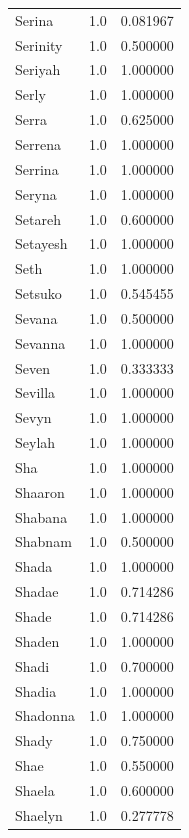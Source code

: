 \documentclass[
  letterpaper,
  DIV=11,
  numbers=noendperiod]{scrreprt}
\begin{document}
\begin{tabular}{lrr}
Serina          &   1.0 &   0.081967 \\
Serinity        &   1.0 &   0.500000 \\
Seriyah         &   1.0 &   1.000000 \\
Serly           &   1.0 &   1.000000 \\
Serra           &   1.0 &   0.625000 \\
Serrena         &   1.0 &   1.000000 \\
Serrina         &   1.0 &   1.000000 \\
Seryna          &   1.0 &   1.000000 \\
Setareh         &   1.0 &   0.600000 \\
Setayesh        &   1.0 &   1.000000 \\
Seth            &   1.0 &   1.000000 \\
Setsuko         &   1.0 &   0.545455 \\
Sevana          &   1.0 &   0.500000 \\
Sevanna         &   1.0 &   1.000000 \\
Seven           &   1.0 &   0.333333 \\
Sevilla         &   1.0 &   1.000000 \\
Sevyn           &   1.0 &   1.000000 \\
Seylah          &   1.0 &   1.000000 \\
Sha             &   1.0 &   1.000000 \\
Shaaron         &   1.0 &   1.000000 \\
Shabana         &   1.0 &   1.000000 \\
Shabnam         &   1.0 &   0.500000 \\
Shada           &   1.0 &   1.000000 \\
Shadae          &   1.0 &   0.714286 \\
Shade           &   1.0 &   0.714286 \\
Shaden          &   1.0 &   1.000000 \\
Shadi           &   1.0 &   0.700000 \\
Shadia          &   1.0 &   1.000000 \\
Shadonna        &   1.0 &   1.000000 \\
Shady           &   1.0 &   0.750000 \\
Shae            &   1.0 &   0.550000 \\
Shaela          &   1.0 &   0.600000 \\
Shaelyn         &   1.0 &   0.277778 \\

\end{tabular}
\end{document}
